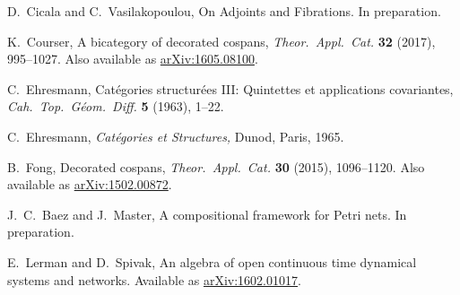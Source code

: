\documentclass{amsart}
\begin{document}
\begin{thebibliography}{100}
 D.\ Cicala and C.\ Vasilakopoulou, On Adjoints and Fibrations. In preparation.

 K.\ Courser, A bicategory of decorated cospans, \emph{Theor.\ Appl.\ Cat.} \textbf{32} (2017), 995--1027. Also available as \href{https://arxiv.org/abs/1605.08100}{arXiv:1605.08100}.



 C.\ Ehresmann, Cat\'egories structur\'ees III: Quintettes et applications covariantes,  \textsl{Cah.\ Top.\ G\'eom.\ Diff.} \textbf{5} (1963), 1--22.

 C.\ Ehresmann, {\sl Cat\'egories et Structures,} Dunod, Paris, 1965.

 B.\ Fong, Decorated cospans, \emph{Theor.\ Appl.\ Cat.} \textbf{30} (2015), 1096--1120. Also available as \href{http://arxiv.org/abs/1502.00872}{arXiv:1502.00872}.





 J.\ C.\ Baez and J.\ Master, A compositional framework for Petri nets. In preparation.

 E.\ Lerman and D.\ Spivak, An algebra of open continuous time dynamical systems and networks. Available as \href{http://arxiv.org/abs/1602.01017}{arXiv:1602.01017}.



\end{thebibliography}
\end{document}
